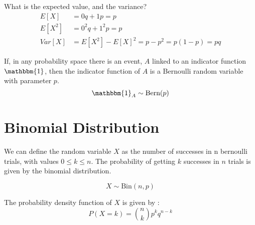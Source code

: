 What is the expected value, and the variance?
\begin{equation}
\begin{aligned}
    E[X] & = 0 q + 1 p = p \\
    E[X^2] & = 0^2 q + 1^2 p = p \\
    Var[X] & = E[X^2] - E[X]^2 = p - p^2 = p(1-p) = pq
\end{aligned}
\end{equation}

If, in any probability space there is an event, $A$ linked to an indicator function $\mathbbm{1}$, then the indicator function of $A$ is a Bernoulli random variable with parameter $p$.
\[
\mathbbm{1}_A \sim \text{Bern}(p)
\]

\newpage
\section{Binomial Distribution}


We can define the random variable $X$ as the number of successes in n bernoulli trials, with values $0 \leq k \leq n$. The probability of getting $k$ successes in $n$ trials is given by the binomial distribution.

\[ 
X \sim \text{Bin}(n, p)
\]

The probability density function of $X$ is given by
:
\begin{equation}
    P(X=k) = \binom{n}{k} p^k q^{n-k}
\end{equation}

